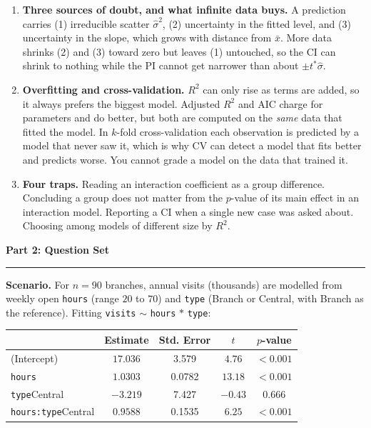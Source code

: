 \documentclass[11pt]{article}
\newcommand{\parttitle}[1]{%
  \par\medskip\noindent
  {\large\bfseries #1}\par
  \vspace{-.5em}\noindent\rule{\linewidth}{0.4pt}\par\smallskip}
\begin{document}
{\begin{enumerate}[label=\textbf{\arabic*.}, wide=0pt, itemsep=.4em, topsep=.5em]
\item \textbf{Three sources of doubt, and what infinite data buys.} A prediction carries
(1) irreducible scatter $\hat\sigma^2$, (2) uncertainty in the fitted level, and (3) uncertainty in
the slope, which grows with distance from $\bar{x}$. More data shrinks (2) and (3) toward zero but
leaves (1) untouched, so the CI can shrink to nothing while the PI cannot get narrower than about
$\pm t^{\ast}\hat\sigma$.

\item \textbf{Overfitting and cross-validation.} $R^2$ can only rise as terms are added, so it
always prefers the biggest model. Adjusted $R^2$ and AIC charge for parameters and do better, but
both are computed on the \emph{same} data that fitted the model. In $k$-fold cross-validation each
observation is predicted by a model that never saw it, which is why CV can detect a model that fits
better and predicts worse. You cannot grade a model on the data that trained it.

\item \textbf{Four traps.} Reading an interaction coefficient as a group difference. Concluding a
group does not matter from the $p$-value of its main effect in an interaction model. Reporting a CI
when a single new case was asked about. Choosing among models of different size by $R^2$.

\end{enumerate}

}

\newpage

\parttitle{Part 2: Question Set}

\noindent\textbf{Scenario.} For $n = 90$ branches, annual visits (thousands) are modelled from
weekly open \texttt{hours} (range $20$ to $70$) and \texttt{type} (Branch or Central, with Branch as
the reference). Fitting \texttt{visits} $\sim$ \texttt{hours} $\ast$ \texttt{type}:

\begin{center}
\renewcommand{\arraystretch}{1.2}
\begin{tabular}{lcccc}
\toprule
 & \textbf{Estimate} & \textbf{Std. Error} & \textbf{$t$} & \textbf{$p$-value} \\
\midrule
(Intercept) & $17.036$ & 3.579 & $4.76$ & $<0.001$ \\
\texttt{hours} & $1.0303$ & 0.0782 & $13.18$ & $<0.001$ \\
\texttt{type}Central & $-3.219$ & 7.427 & $-0.43$ & $0.666$ \\
\texttt{hours:type}Central & $0.9588$ & 0.1535 & $6.25$ & $<0.001$ \\
\bottomrule
\end{tabular}
\end{center}
\end{document}
